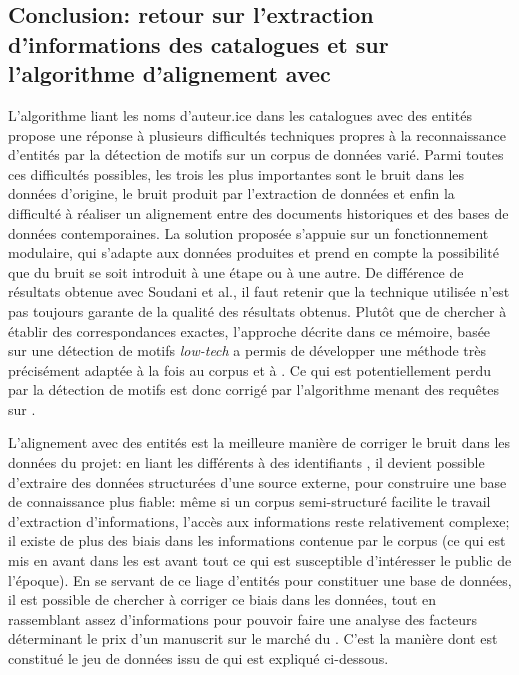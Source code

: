 \subsection{Conclusion: retour sur l'extraction d'informations des catalogues et sur l'algorithme d'alignement avec \wkd{}}
L'algorithme liant les noms d'auteur.ice dans les catalogues avec des entités \wkd{} propose une réponse à plusieurs difficultés techniques propres à la reconnaissance d'entités par la détection de motifs sur un corpus de données varié. Parmi toutes ces difficultés possibles, les trois les plus importantes sont le bruit dans les données d'origine, le bruit produit par l'extraction de données et enfin la difficulté à réaliser un alignement entre des documents historiques et des bases de données contemporaines. La solution proposée s'appuie sur un fonctionnement modulaire, qui s'adapte aux données produites et prend en compte la possibilité que du bruit se soit introduit à une étape ou à une autre. De différence de résultats obtenue avec Soudani et al., il faut retenir que la technique utilisée n'est pas toujours garante de la qualité des résultats obtenus. Plutôt que de chercher à établir des correspondances exactes, l'approche décrite dans ce mémoire, basée sur une détection de motifs \textit{low-tech} a permis de développer une méthode très précisément adaptée à la fois au corpus et à \wkd{}. Ce qui est potentiellement perdu par la détection de motifs est donc corrigé par l'algorithme menant des requêtes sur \wkd{}. 

L'alignement avec des entités \wkd{} est la meilleure manière de corriger le bruit dans les données du projet: en liant les différents \tname{} à des identifiants \wkd{}, il devient possible d'extraire des données structurées d'une source externe, pour construire une base de connaissance plus fiable: même si un corpus semi-structuré facilite le travail d'extraction d'informations, l'accès aux informations reste relativement complexe; il existe de plus des biais dans les informations contenue par le corpus (ce qui est mis en avant dans les \ttrait{} est avant tout ce qui est susceptible d'intéresser le public de l'époque). En se servant de ce liage d'entités pour constituer une base de données, il est possible de chercher à corriger ce biais dans les données, tout en rassemblant assez d'informations pour pouvoir faire une analyse des facteurs déterminant le prix d'un manuscrit sur le marché du  . C'est la manière dont est constitué le jeu de données issu de \wkd{} qui est expliqué ci-dessous.

